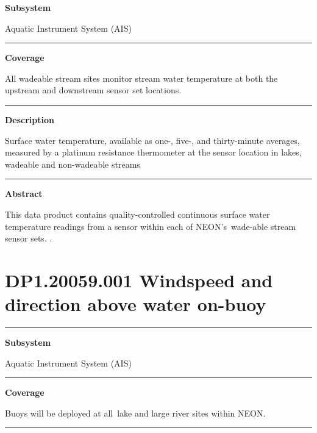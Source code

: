 \documentclass[]{article}
\begin{document}
\textbf{Subsystem}

Aquatic Instrument System (AIS)

\begin{center}\rule{0.5\linewidth}{\linethickness}\end{center}

\textbf{Coverage}

All wadeable stream sites monitor stream water temperature at both the
upstream and downstream sensor set locations.

\begin{center}\rule{0.5\linewidth}{\linethickness}\end{center}

\textbf{Description}

Surface water temperature, available as one-, five-, and thirty-minute
averages, measured by a platinum resistance thermometer at the sensor
location in lakes, wadeable and non-wadeable streams

\begin{center}\rule{0.5\linewidth}{\linethickness}\end{center}

\textbf{Abstract}

This data product contains quality-controlled continuous surface water
temperature readings from a sensor within each of NEON's~wade-able
stream sensor sets. \newpage
.

\section{DP1.20059.001 Windspeed and direction above water
on-buoy}\label{dp1.20059.001-windspeed-and-direction-above-water-on-buoy}

\begin{center}\rule{0.5\linewidth}{\linethickness}\end{center}

\textbf{Subsystem}

Aquatic Instrument System (AIS)

\begin{center}\rule{0.5\linewidth}{\linethickness}\end{center}

\textbf{Coverage}

Buoys will be deployed at all~lake and large river sites within NEON.

\begin{center}\rule{0.5\linewidth}{\linethickness}\end{center}
\end{document}

